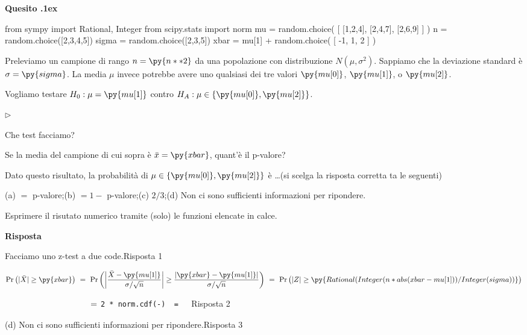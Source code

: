 \documentclass[11pt,twoside,a4paper]{article}
\newcommand{\mylabel}[1]{#1\hfill}
\renewenvironment{itemize}
  {\begin{list}{$\triangleright$}{%
   \setlength{\parskip}{0mm}
   \setlength{\topsep}{.4\baselineskip}
   \setlength{\rightmargin}{0mm}
   \setlength{\listparindent}{0mm}
   \setlength{\itemindent}{0mm}
   \setlength{\labelwidth}{2ex}
   \setlength{\itemsep}{.4\baselineskip}
   \setlength{\parsep}{0mm}
   \setlength{\partopsep}{0mm}
   \setlength{\labelsep}{1ex}
   \setlength{\leftmargin}{\labelwidth+\labelsep}
   \let\makelabel\mylabel}}{%
   \end{list}\vspace*{-1.3mm}}
\def\Pr{{\rm Pr\,}}
\newcounter{quesito}
\newenvironment{question}{\bigskip\addtocounter{quesito}{1}\par\textbf{Quesito \thequesito.\kern1ex}}{\vspace{\parskip}}
\newenvironment{answer}{\par\textbf{Risposta\quad}}{\vspace{\parskip}}
\begin{document}
\begin{question} %
\begin{pycode}
from sympy import Rational, Integer
from scipy.stats import norm
mu = random.choice( [ [1,2,4], [2,4,7], [2,6,9] ] ) 
n = random.choice([2,3,4,5])
sigma = random.choice([2,3,5])
xbar = mu[1] + random.choice( [ -1, 1, 2 ] ) 
\end{pycode}
Preleviamo un campione di rango $n=\py{n**2}$ da una popolazione con distribuzione $N(\mu,\sigma^2)$. Sappiamo che la deviazione standard è $\sigma=\py{sigma}$. La media $\mu$ invece potrebbe avere uno qualsiasi dei tre valori $\py{mu[0]}$, $\py{mu[1]}$, o $\py{mu[2]}$. 

Vogliamo testare $H_0:\mu=\py{mu[1]}$ contro $H_A:\mu\in\{\py{mu[0]},\py{mu[2]}\}$.
\begin{itemize}
\item[1.] Che test facciamo?
\item[2.] Se la media del campione di cui sopra è $\bar x=\py{xbar}$, quant'è il p-valore?
\item[3.] Dato questo risultato, la probabilità di $\mu\in\{\py{mu[0]},\py{mu[2]}\}$ è \ldots (si scelga la risposta corretta ta le seguenti)\medskip

(a) $=$ p-valore;\hfill (b) $=1-$ p-valore;\hfill (c) $2/3$;\hfill (d) Non ci sono sufficienti informazioni per ripondere.
\end{itemize}

Esprimere il risutato numerico tramite (solo) le funzioni elencate in calce.
\begin{answer}

{\color{blue}Facciamo uno z-test a due code.\hfill Risposta 1}

$\Pr\big(|\bar X|\ge\py{xbar}\big)\ =\ \Pr\bigg(\bigg|\dfrac{\bar X-\py{mu[1]}}{\sigma/\sqrt{n}}\bigg|\ge\dfrac{|\py{xbar}-\py{mu[1]}| }{\sigma/\sqrt{n} }\bigg)\ =\ \Pr\big(|Z|\ge\py{Rational(Integer(n*abs(xbar-mu[1]) ) / Integer(sigma) ) }\big)$

$\phantom{\Pr\big(|\bar X|\ge\py{xbar}\big)}\ =\ ${\color{blue}\tt 2 * norm.cdf(-) }{\tt\ =  \  }{\color{blue}\hfill Risposta 2}

\medskip
{\color{blue}(d) Non ci sono sufficienti informazioni per ripondere.\hfill Risposta 3}

\end{answer}
\end{question}
\end{document}
